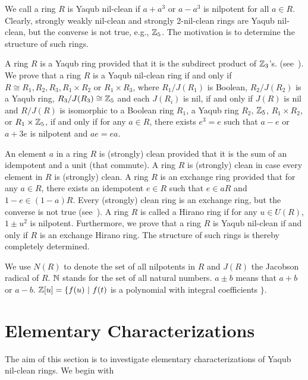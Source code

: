 \documentclass[12pt, reqno]{amsart}
\numberwithin{equation}{section}
\begin{document}
We call a ring $R$ is Yaqub nil-clean if $a+a^3$ or $a-a^3$ is nilpotent for all $a\in R$. Clearly, strongly weakly nil-clean and strongly 2-nil-clean rings are Yaqub nil-clean, but the converse is not true, e.g., ${\Bbb Z}_5$. The motivation is to determine the structure of such rings.

A ring $R$ is a Yaqub ring provided that it is the subdirect product of ${\Bbb Z}_3$'s. (see~\cite{CS}).
We prove that a ring $R$ is a Yaqub nil-clean ring if and only if $R\cong R_1, R_2,R_3,R_1\times R_2$ or $R_1\times R_3$, where
$R_1/J(R_1)$ is Boolean, $R_2/J(R_2)$ is a Yaqub ring, $R_3/J(R_3)\cong {\Bbb Z}_5$ and each $J(R_i)$ is nil, if and only if $J(R)$ is nil and
$R/J(R)$ is isomorphic to a Boolean ring $R_1$, a Yaqub ring $R_2$, ${\Bbb Z}_5$, $R_1\times R_2$, or $R_1\times {\Bbb Z}_5$, if and only if for any $a\in R$, there exists $e^3=e$ such that $a-e$ or $a+3e$ is nilpotent and $ae=ea$.

An element $a$ in a ring $R$ is (strongly) clean provided that it is the sum of an idempotent and a unit (that commute). A ring $R$ is (strongly) clean in case every element in $R$ is (strongly) clean. A ring $R$ is an exchange ring provided that for any $a\in R$, there
exists an idempotent $e\in R$ such that $e\in aR$ and $1-e\in (1-a)R$. Every (strongly) clean ring is an exchange ring, but the converse is not true (see~\cite[Proposition 1.8]{N}). A ring $R$ is called a Hirano ring if for any $u\in U(R)$, $1\pm u^2$ is nilpotent. Furthermore, we prove that a ring $R$ is Yaqub nil-clean if and only if $R$ is an exchange Hirano ring. The structure of such rings is thereby completely determined.

We use $N(R)$ to denote the set of all nilpotents in $R$ and $J(R)$ the Jacobson radical of $R$. ${\Bbb N}$ stands for the set of all natural numbers. $a\pm b$ means that $a+b$ or $a-b$. ${\Bbb Z}[u]=\{ f(u)~|~f(t)$ is a polynomial with integral coefficients $\}$.

\section{Elementary Characterizations}

The aim of this section is to investigate elementary characterizations of Yaqub nil-clean rings. We begin with
\end{document}
